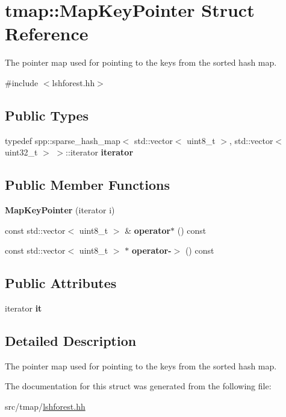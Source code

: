 \hypertarget{structtmap_1_1MapKeyPointer}{}\section{tmap\+:\+:Map\+Key\+Pointer Struct Reference}
\label{structtmap_1_1MapKeyPointer}


The pointer map used for pointing to the keys from the sorted hash map.  




{\ttfamily \#include $<$lshforest.\+hh$>$}

\subsection*{Public Types}
\begin{DoxyCompactItemize}
\item 
\mbox{\label{structtmap_1_1MapKeyPointer_a236dc7396d6a4dca2a942196aa536f56}} 
typedef spp\+::sparse\+\_\+hash\+\_\+map$<$ std\+::vector$<$ uint8\+\_\+t $>$, std\+::vector$<$ uint32\+\_\+t $>$ $>$\+::iterator {\bfseries iterator}
\end{DoxyCompactItemize}
\subsection*{Public Member Functions}
\begin{DoxyCompactItemize}
\item 
\mbox{\label{structtmap_1_1MapKeyPointer_ac96f2c30e0923aa2b24674d1d0a8951f}} 
{\bfseries Map\+Key\+Pointer} (iterator i)
\item 
\mbox{\label{structtmap_1_1MapKeyPointer_ade7f29bcf8ac9ec5875f1152d50912e4}} 
const std\+::vector$<$ uint8\+\_\+t $>$ \& {\bfseries operator$\ast$} () const
\item 
\mbox{\label{structtmap_1_1MapKeyPointer_ab681e8610b86e353af4feb6ea0ef8a9a}} 
const std\+::vector$<$ uint8\+\_\+t $>$ $\ast$ {\bfseries operator-\/$>$} () const
\end{DoxyCompactItemize}
\subsection*{Public Attributes}
\begin{DoxyCompactItemize}
\item 
\mbox{\label{structtmap_1_1MapKeyPointer_a7e5f9fcf74a41f693afd2a727a2997d5}} 
iterator {\bfseries it}
\end{DoxyCompactItemize}


\subsection{Detailed Description}
The pointer map used for pointing to the keys from the sorted hash map. 

The documentation for this struct was generated from the following file\+:\begin{DoxyCompactItemize}
\item 
src/tmap/\hyperlink{lshforest_8hh}{lshforest.\+hh}\end{DoxyCompactItemize}
